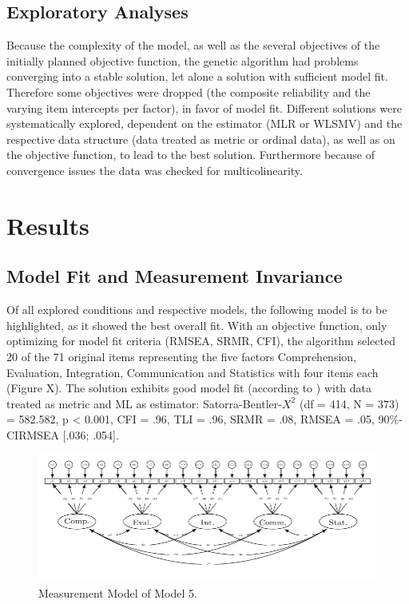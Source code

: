 \documentclass[
  12pt,
  a4paper,
  twoside]{article}
\begin{document}
\subsection{Exploratory Analyses}\label{exploratory-analyses}

Because the complexity of the model, as well as the several objectives of the initially planned objective function, the genetic algorithm had problems converging into a stable solution, let alone a solution with sufficient model fit. Therefore some objectives were dropped (the composite reliability and the varying item intercepts per factor), in favor of model fit. Different solutions were systematically explored, dependent on the estimator (MLR or WLSMV) and the respective data structure (data treated as metric or ordinal data), as well as on the objective function, to lead to the best solution. Furthermore because of convergence issues the data was checked for multicolinearity.

\section{Results}\label{results}

\subsection{Model Fit and Measurement Invariance}\label{model-fit-and-measurement-invariance}

Of all explored conditions and respective models, the following model is to be highlighted, as it showed the best overall fit.
With an objective function, only optimizing for model fit criteria (RMSEA, SRMR, CFI), the algorithm selected 20 of the 71 original items representing the five factors Comprehension, Evaluation, Integration, Communication and Statistics with four items each (Figure X). The solution exhibits good model fit (according to ) with data treated as metric and ML as estimator: Satorra-Bentler-\(X^{2}\) (df = 414, N = 373) = 582.582, p \textless{} 0.001, CFI = .96, TLI = .96, SRMR = .08, RMSEA = .05, 90\%-CIRMSEA {[}.036; .054{]}.

\begin{figure}

{\centering \includegraphics[width=1\linewidth]{images/Model5} 

}

\caption{Measurement Model of Model 5.  }\label{fig:model3}
\end{figure}
\end{document}
